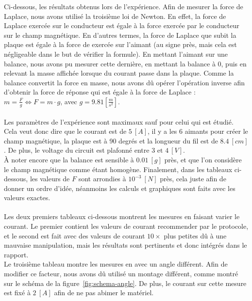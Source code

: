 \documentclass[11pt]{article}
\begin{document}
    Ci-dessous, les résultats obtenus lors de l'expérience.
    Afin de mesurer la force de Laplace, nous avons utilisé la troisième loi de Newton.
    En effet, la force de Laplace exercée sur le conducteur est égale à la force exercée
    par le conducteur sur le champ magnétique.
    En d'autres termes, la force de Laplace que subit la plaque est égale à la force de
    exercée sur l'aimant (au signe près, mais cela est négligeable dans le but de vérifier la formule).
    En mettant l'aimant sur une balance, nous avons pu mesurer cette dernière, en mettant la balance à 0,
    puis en relevant la masse affichée lorsque du courant passe dans la plaque.
    Comme la balance convertit la force en masse, nous avons dû opérer l'opération inverse afin d'obtenir
    la force de réponse qui est égale à la force de Laplace : $ m = \frac{F}{g} \Leftrightarrow F = m \cdot g $,
    avec $ g = 9.81 \left[\frac{m}{s^2}\right] $.\\ \\
    Les paramètres de l'expérience sont maximaux sauf pour celui qui est étudié.
    Cela veut donc dire que le courant est de $5 \ [A]$, il y a les 6 aimants pour créer le champ magnétique,
    la plaque est à 90 degrés et la longueur du fil est de $8.4 \ [cm]$.
    De plus, le voltage du circuit est plafonné entre $3 \text{ et } 4 \ [V]$. \\
    À noter encore que la balance est sensible à $0.01 \ [g]$ près, et que l'on considère le champ magnétique
    comme étant homogène.
    Finalement, dans les tableaux ci-dessous, les valeurs de $F$ sont arrondies à $10^{-3} \ [N]$ près,
    cela juste afin de donner un ordre d'idée, néanmoins les calculs et graphiques sont faits avec les valeurs
    exactes. \\ \\
    Les deux premiers tableaux ci-dessous montrent les mesures en faisant varier le courant.
    Le premier contient les valeurs de courant recommender par le protocole, et le second est fait avec des
    valeurs de courant $ 10 \times$ plus petites dû à une mauvaise manipulation, mais les résultats sont
    pertinents et donc intégrés dans le rapport. \\
    Le troisième tableau montre les mesures en avec un angle différent.
    Afin de modifier ce facteur, nous avons dû utilisé un montage différent, comme montré sur le
    schéma de la figure~\ref{fig:schema-angle}.
    De plus, le courant sur cette mesure est fixé à $2 \ [A]$ afin de ne pas abimer le matériel.
\end{document}
